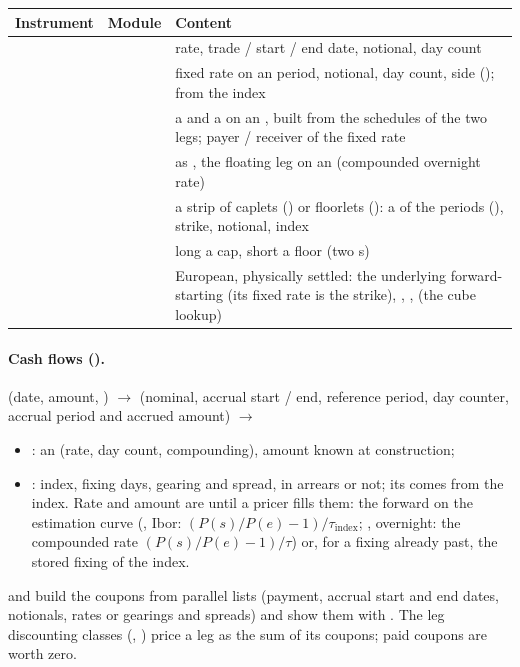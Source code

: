\begin{center}
\small
\begin{tabular}{@{}L{3.2cm}L{3.3cm}L{8.6cm}@{}}
\toprule
Instrument & Module & Content \\
\midrule
{} &  & rate, trade / start / end date, notional, day count \\
 &  & fixed rate on an  period, notional, day count, side
  ();  from the index \\
 &  & a  and a  on an , built from
  the schedules of the two legs;  payer / receiver of the fixed rate \\
 &  & as , the floating leg on an  (compounded overnight rate) \\
 &  & a strip of caplets () or floorlets (): a
   of the periods (), strike, notional, index \\
 &  & long a cap, short a floor (two s) \\
 &  & European, physically settled: the underlying forward-starting  (its
  fixed rate is the strike), , ,  (the cube lookup) \\
\bottomrule
\end{tabular}
\end{center}

\paragraph{Cash flows ().}  (date, amount, ) $\to$ 
(nominal, accrual start / end, reference period, day counter, accrual period and accrued amount) $\to$
\begin{itemize}[nosep]
  \item {}: an  (rate, day count, compounding), amount known at construction;
  \item {}: index, fixing days, gearing and spread, in arrears or not; its 
        comes from the index. Rate and amount are  until a pricer fills them: the forward on the
        estimation curve (, Ibor: $(P(s)/P(e) - 1)/\tau_{\text{index}}$;
        , overnight: the compounded rate $(P(s)/P(e) - 1)/\tau$) or, for a fixing already
        past, the stored fixing of the index.
\end{itemize}
 and  build the coupons from parallel lists (payment, accrual start and end
dates, notionals, rates or gearings and spreads) and show them with . The leg discounting
classes (, ) price a leg as the sum of its coupons; paid
coupons are worth zero.

